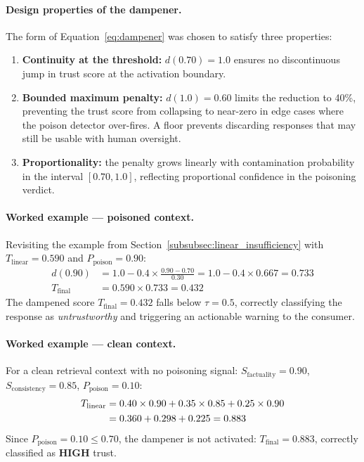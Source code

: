 \paragraph{Design properties of the dampener.}
The form of Equation~\ref{eq:dampener} was chosen to satisfy three properties:
\begin{enumerate}
    \item \textbf{Continuity at the threshold:} $d(0.70) = 1.0$ ensures no discontinuous
    jump in trust score at the activation boundary.
    \item \textbf{Bounded maximum penalty:} $d(1.0) = 0.60$ limits the reduction to 40\%,
    preventing the trust score from collapsing to near-zero in edge cases where the poison
    detector over-fires. A floor prevents discarding responses that may still be usable
    with human oversight.
    \item \textbf{Proportionality:} the penalty grows linearly with contamination probability
    in the interval $[0.70, 1.0]$, reflecting proportional confidence in the poisoning verdict.
\end{enumerate}

\paragraph{Worked example --- poisoned context.}
Revisiting the example from Section~\ref{subsubsec:linear_insufficiency} with
$T_{\text{linear}} = 0.590$ and $P_{\text{poison}} = 0.90$:
\begin{align}
d(0.90) &= 1.0 - 0.4 \times \frac{0.90 - 0.70}{0.30} = 1.0 - 0.4 \times 0.667 = 0.733 \\
T_{\text{final}} &= 0.590 \times 0.733 = 0.432
\end{align}
The dampened score $T_{\text{final}} = 0.432$ falls below $\tau = 0.5$, correctly
classifying the response as \textit{untrustworthy} and triggering an actionable warning
to the consumer.

\paragraph{Worked example --- clean context.}
For a clean retrieval context with no poisoning signal:
$S_{\text{factuality}} = 0.90$, $S_{\text{consistency}} = 0.85$, $P_{\text{poison}} = 0.10$:
\begin{align}
T_{\text{linear}} &= 0.40 \times 0.90 + 0.35 \times 0.85 + 0.25 \times 0.90 \notag \\
                  &= 0.360 + 0.298 + 0.225 = 0.883
\end{align}
Since $P_{\text{poison}} = 0.10 \leq 0.70$, the dampener is not activated:
$T_{\text{final}} = 0.883$, correctly classified as \textbf{HIGH} trust.

